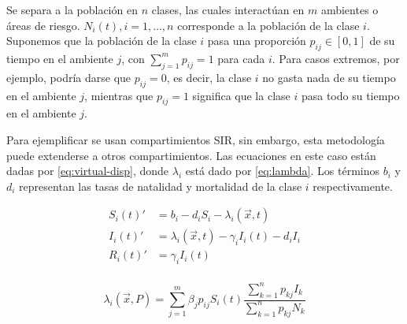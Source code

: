 
Se separa a la población en \(n\) clases, las cuales interactúan en \(m\) ambientes o áreas de riesgo. \(N_i(t), i = 1, \dots, n\) corresponde a la población de la clase \(i\). Suponemos que la población de la clase \(i\) pasa una proporción \(p_{ij} \in [0,1]\) de su tiempo en el ambiente \(j\), con \(\sum_{j = 1}^{m} p_{ij} = 1\) para cada \(i\). Para casos extremos, por ejemplo, podría darse que \(p_{ij} = 0\), es decir, la clase \(i\) no gasta nada de su tiempo en el ambiente \(j\), mientras que \(p_{ij} = 1\) significa que la clase \(i\) pasa todo su tiempo en el ambiente \(j\). 

Para ejemplificar se usan compartimientos SIR, sin embargo, esta metodología puede extenderse a otros compartimientos. Las ecuaciones en este caso están dadas por \ref{eq:virtual-disp}, donde \(\lambda_i\) está dado por \ref{eq:lambda}. Los términos \(b_i\) y \(d_i\) representan las tasas de natalidad y mortalidad de la clase \(i\) respectivamente.

\begin{equation}\label{eq:virtual-disp}
\begin{aligned}
S_i(t)' &=  b_i - d_i S_i - {\lambda_i(\vec{x}, t) } \\
I_i(t)' &= {\lambda_i(\vec{x}, t) } - \gamma_i I_i(t) - d_i I_i\\
R_i(t)' &= \gamma_i I_i(t)\\ 
\end{aligned}
\end{equation}

\begin{equation}\label{eq:lambda}
\lambda_i(\vec{x}, P) = \sum_{j=1}^m \beta_{j}p_{ij}S_i(t)\frac{\sum_{k=1}^{n} p_{kj} I_k}{\sum_{k=1}^{n} p_{kj}N_k}
\end{equation}

